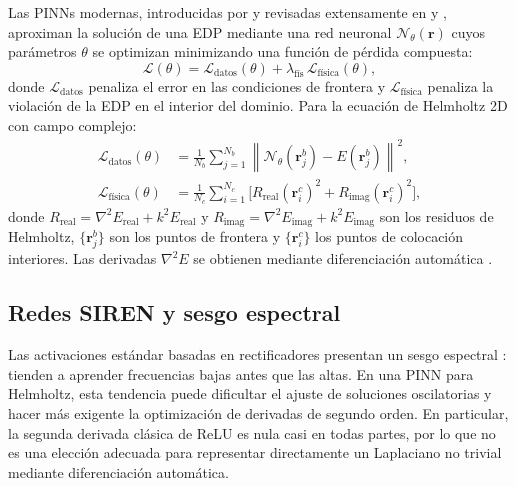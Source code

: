 Las PINNs modernas, introducidas por \textcite{raissi2019physics} y revisadas
extensamente en \textcite{karniadakis2021physics} y \textcite{cuomo2022scientific},
aproximan la solución de una EDP mediante una red neuronal
$\mathcal{N}_\theta(\mathbf{r})$ cuyos parámetros $\theta$ se optimizan
minimizando una función de pérdida compuesta:
%
\begin{equation}
    \mathcal{L}(\theta) = \mathcal{L}_\text{datos}(\theta)
    + \lambda_\text{fís}\,\mathcal{L}_\text{física}(\theta),
    \label{eq:loss_total}
\end{equation}
%
donde $\mathcal{L}_\text{datos}$ penaliza el error en las condiciones de
frontera y $\mathcal{L}_\text{física}$ penaliza la violación de la EDP en el
interior del dominio. Para la ecuación de Helmholtz 2D con campo complejo:
%
\begin{align}
    \mathcal{L}_\text{datos}(\theta) &=
    \frac{1}{N_b}\sum_{j=1}^{N_b}
    \left\|\mathcal{N}_\theta(\mathbf{r}_j^b) - E(\mathbf{r}_j^b)\right\|^2,
    \label{eq:loss_datos} \\[4pt]
    \mathcal{L}_\text{física}(\theta) &=
    \frac{1}{N_c}\sum_{i=1}^{N_c}
    \bigl[R_\text{real}(\mathbf{r}_i^c)^2 + R_\text{imag}(\mathbf{r}_i^c)^2\bigr],
    \label{eq:loss_fisica}
\end{align}
%
donde $R_\text{real} = \nabla^2 E_\text{real} + k^2 E_\text{real}$ y
$R_\text{imag} = \nabla^2 E_\text{imag} + k^2 E_\text{imag}$ son los residuos
de Helmholtz, $\{\mathbf{r}_j^b\}$ son los puntos de frontera y
$\{\mathbf{r}_i^c\}$ los puntos de colocación interiores. Las derivadas
$\nabla^2 E$ se obtienen mediante diferenciación automática
\parencite{baydin2018autodiff}.

\subsection{Redes SIREN y sesgo espectral}

Las activaciones estándar basadas en rectificadores presentan un sesgo
espectral
\parencite{rahaman2019spectral}: tienden a aprender frecuencias bajas antes que
las altas. En una PINN para Helmholtz, esta tendencia puede dificultar el ajuste
de soluciones oscilatorias y hacer más exigente la optimización de derivadas de
segundo orden. En particular, la segunda derivada clásica de ReLU es nula casi
en todas partes, por lo que no es una elección adecuada para representar
directamente un Laplaciano no trivial mediante diferenciación automática.


